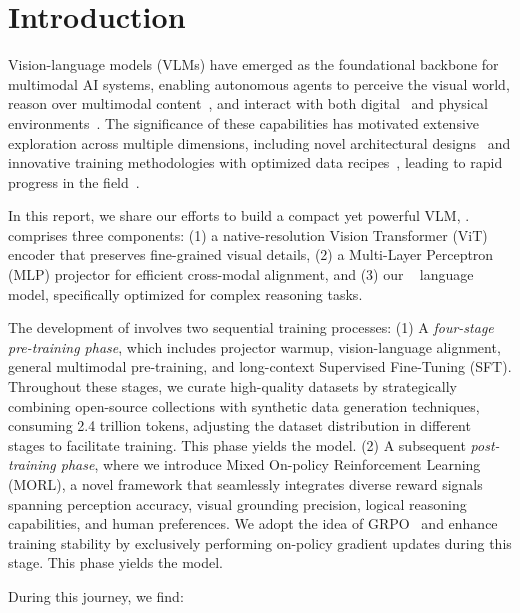 \section{Introduction}
Vision-language models (VLMs) have emerged as the foundational backbone for multimodal AI systems, enabling autonomous agents to perceive the visual world, reason over multimodal content~\citep{yue2023mmmu}, and interact with both digital~\citep{xie2024osworld,cua2025} and physical environments~\citep{rt2,pi0}. 
The significance of these capabilities has motivated extensive exploration across multiple dimensions, including novel architectural designs~\citep{Alayrac2022FlamingoAV,team2024chameleon,dream2025} and innovative training methodologies with optimized data recipes~\citep{prismaticVLM,nvlm2024}, leading to rapid progress in the field~\citep{liu2023llava,tong2024cambrian,Qwen25VL}.



In this report, we share our efforts to build a compact yet powerful VLM, \mimovl{}. \mimovl{} comprises three components: (1) a native-resolution Vision Transformer (ViT) encoder that preserves fine-grained visual details, (2) a Multi-Layer Perceptron (MLP) projector for efficient cross-modal alignment, and (3) our \mimo{}~\citep{xia2025mimo} language model, specifically optimized for complex reasoning tasks. 

The development of \mimovl{} involves two sequential training processes: 
(1) A \emph{four-stage pre-training phase}, which includes projector warmup, vision-language alignment, general multimodal pre-training, and long-context Supervised Fine-Tuning (SFT). 
Throughout these stages, we curate high-quality datasets by strategically combining open-source collections with synthetic data generation techniques, consuming 2.4 trillion tokens, adjusting the dataset distribution in different stages to facilitate training. This phase yields the \textbf{\mimovlsft{}} model. 
(2) A subsequent \emph{post-training phase}, where we introduce Mixed On-policy Reinforcement Learning (MORL), a novel framework that seamlessly integrates diverse reward signals spanning perception accuracy, visual grounding precision, logical reasoning capabilities, and human preferences. 
We adopt the idea of GRPO~\citep{shao2024deepseekmath} and enhance training stability by exclusively performing on-policy gradient updates during this stage. This phase yields the \textbf{\mimovlrl{}} model.


During this journey, we find:

